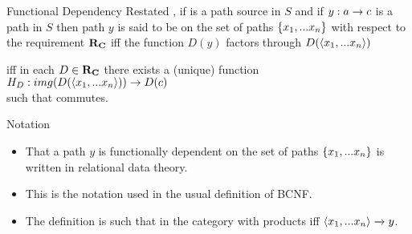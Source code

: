 \begin{frame}{Functional Dependency Restated}{\slidecontext}
\IfSforproductepimonoCwithRCwords, 
if  is a path source in $S$ and if
$y: a \rightarrow c$ is a path in $S$
then path $y$ is said to be  on the set of paths $\left\{x_1,...x_n\right\}$ with respect to the requirement $\textbf{R}_{\textbf{C}}$
iff the function $D(y)$ factors through $D(\langle x_1,... x_n \rangle)$

\pause iff in each $D \in \textbf{R}_{\textbf{C}}$ there exists a  (unique)
function $H_D: img(D(\langle x_1,... x_n \rangle)) \rightarrow D(c)$ \\
\hspace*{\fill}such that \kern14pt
 commutes.
\end{frame}
\fi
\iffalse
\begin{frame} 
CORRECT THIS DIAGRAM
\scalebox{0.9}{ 
$
\begin{array}{cp{2cm}ccp{0.5cm}cc}
                & &         & \Rnode{Eb1}{D(b_1)}& &                            &        \\[0.6cm]
                & &         & \Rnode{Eb2}{D(b_2)}& &                            &        \\[0.6cm]
                & &\vdots   &                     & &                            &        \\[0.2cm]                                              
\Rnode{Ea}{D(a)} & &         & \Rnode{Ebn}{D(b_n)}& & \Rnode{Jnctn}{}            &        \\[1.0cm]
                & &         & \Rnode{Ec}{D(c)}   & &                            &  
\end{array}
\begin{arrows}
\simplepath{Ea}{Eb1}
\alabel{D(x_1)}
\simplepath{Ea}{Eb2}
\alabel{D(x_2)}
\simplepath{Ea}{Ebn}
\alabel{D(x_n)}
\simplepath{Ea}{Ec}
\blabel{D(y)}
\nchpmarr[15][45]{Eb1}{Ebn}{Jnctn}{Ec}
\naput[npos=-0.1]{$h_D$}
\ncarc[arcangle=15]{Eb2}{Jnctn}
\end{arrows}
$
}
\end{frame}
\fi

\begin{frame}{Notation}
\begin{itemize}
\item That a path  $y$ is functionally dependent on the set of paths $\left\{x_1,...x_n\right\}$ 
is written   in relational data theory.
\item This is the notation used in the usual definition of BCNF.
\item The definition is such that in the category \catcw with products  iff $\langle x_1,...x_n\rangle \xrightarrow{} y$.
\end{itemize}
\end{frame}

